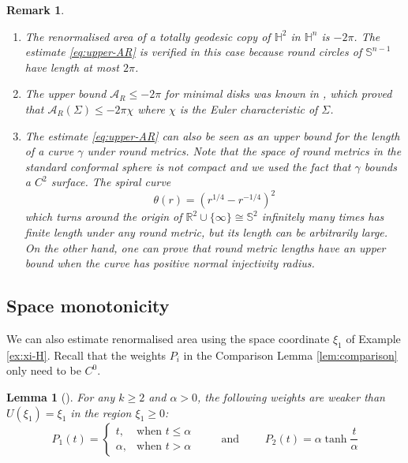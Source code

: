 \documentclass[11pt]{article}
\newtheorem{remark}[theorem]{Remark}
\newtheorem{lemma}[theorem]{Lemma}
\begin{document}
\begin{remark}
\label{rem:upper-AR}
\begin{enumerate}
\item The renormalised area of a totally geodesic copy of \(\mathbb{H}^2\) in \(\mathbb{H}^n\) is \(-2\pi\). The estimate \eqref{eq:upper-AR} is verified in this case because round circles of \(\mathbb{S}^{n-1}\) have length
at most \(2\pi\).
\item The upper bound \(\mathcal{A}_R\leq -2\pi\) for
minimal disks was known in \cite{Alexakis.Mazzeo10_RenormalizedAreaProperly}, which proved that \(\mathcal{A}_R(\Sigma) \leq
   -2\pi\chi\) where
\(\chi\) is the Euler characteristic of \(\Sigma\).
\item The estimate \eqref{eq:upper-AR} can also be seen as an upper bound for the length of a
curve \(\gamma\) under round metrics. 
Note that the space of round metrics in the standard conformal sphere is not compact
and we used the fact that \(\gamma\)
bounds a \(C^2\) surface. The spiral curve
\begin{equation}
\label{eq:spiral}
\theta(r) = \left(r^{1/4} - r^{-1/4}\right)^2   
\end{equation}
which turns around the origin of \(\mathbb{R}^2\cup\{\infty\}\cong \mathbb{S}^2\) infinitely many times has finite length
under any round metric, but its length can be arbitrarily large. On the other hand, one
can prove that round metric lengths have an upper bound when the curve has positive normal injectivity radius.
\end{enumerate}
\end{remark}

\subsection{Space monotonicity}
\label{sec:org87c4563}
We can also estimate renormalised area using the space coordinate \(\xi_1\) of Example
\ref{ex:xi-H}. Recall that the weights \(P_i\) in the Comparison Lemma \ref{lem:comparison}
only need to be \(C^0\).

\begin{lemma}[]
\label{lem:weaker-space}
For any \(k\geq 2\) and \(\alpha >0\), the following weights are weaker than \(U(\xi_1) = \xi_1\) in the region \(\xi_1\geq 0\):
   \[
    P_1 (t) = \begin{cases}
    t  ,  & \text{when $t\leq \alpha$} \\
    \alpha	  , & \text{when $t > \alpha$}
	  \end{cases}
	  \qquad \text{ and }\qquad P_2(t) = \alpha\tanh \frac{t}{\alpha}
   \]
\end{lemma}
\end{document}
